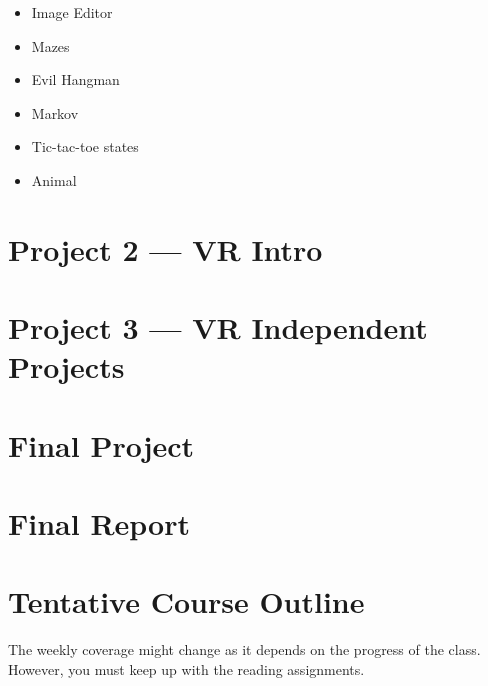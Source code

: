 \documentclass[11pt]{article}
\begin{document}
\begin{itemize}
    \itemsep-0.4em
    \item Image Editor
    \item Mazes
    \item Evil Hangman
    \item Markov
    \item Tic-tac-toe states
    \item Animal
\end{itemize}

\section{Project 2 --- VR Intro}

\section{Project 3 --- VR Independent Projects}

\section{Final Project}

\section{Final Report}

\newpage

\section{Tentative Course Outline}


The weekly coverage might change as it depends on the progress of the class.  However, you must keep up with the reading assignments.
\end{document}
